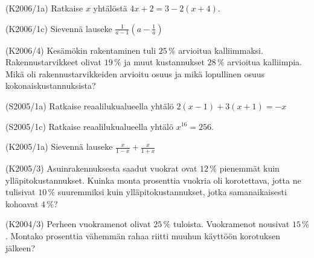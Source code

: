 \begin{multicols}{2}
\begin{tehtava}(K2006/1a) Ratkaise $x$ yhtälöstä $4x + 2 =  3 - 2(x + 4)$.
\end{tehtava}

\begin{tehtava}(K2006/1c) Sievennä lauseke 
                        $ \frac{1}{a - 1} \left( a - \frac{1}{a} \right) $
\end{tehtava}

\begin{tehtava}(K2006/4) Kesämökin rakentaminen tuli $25\,\%$ arvioitua kalliimmaksi. Rakennustarvikkeet olivat $19\,\%$ ja muut kustannukset $28\,\% $ arvioitua kalliimpia. Mikä oli rakennustarvikkeiden arvioitu osuus ja mikä lopullinen osuus kokonaiskustannuksista?
\end{tehtava}

\begin{tehtava}(S2005/1a) Ratkaise reaalilukualueella yhtälö 
                       $ 2(x - 1) + 3(x + 1 ) = -x $
\end{tehtava}

\begin{tehtava}(S2005/1c) Ratkaise reaalilukualueella yhtälö $ x^{16} = 256 $.
\end{tehtava}

\begin{tehtava}(K2005/1a) Sievennä lauseke
                        $ \frac{x}{1 - x} + \frac{x}{1 + x} $
\end{tehtava}


\begin{tehtava}(K2005/3) Asuinrakennuksesta saadut vuokrat ovat $12\,\%$ pienemmät kuin ylläpitokustannukset. Kuinka monta prosenttia vuokria oli korotettava, jotta ne tulisivat $10\,\%$ suuremmiksi kuin ylläpitokustannukset, jotka samanaikaisesti kohoavat $4\,\%$?
\end{tehtava}

\begin{tehtava}(K2004/3) Perheen vuokramenot olivat $25\,\%$ tuloista. Vuokramenot nousivat $15\,\%$. Montako prosenttia vähemmän rahaa riitti muuhun käyttöön korotuksen jälkeen?
\end{tehtava}


\end{multicols}
